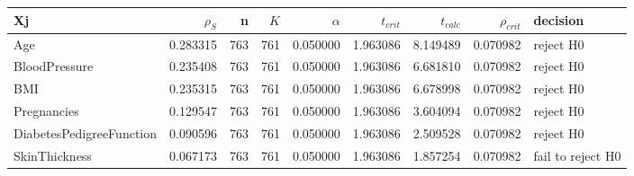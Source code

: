 \begin{tabular}{lrrrrrrrl}
\toprule
Xj & $\rho_S$ & n & $K$ & $\alpha$ & $t_{crit}$ & $t_{calc}$ & $\rho_{crit}$ & decision \\
\midrule
Age & 0.283315 & 763 & 761 & 0.050000 & 1.963086 & 8.149489 & 0.070982 & reject H0 \\
BloodPressure & 0.235408 & 763 & 761 & 0.050000 & 1.963086 & 6.681810 & 0.070982 & reject H0 \\
BMI & 0.235315 & 763 & 761 & 0.050000 & 1.963086 & 6.678998 & 0.070982 & reject H0 \\
Pregnancies & 0.129547 & 763 & 761 & 0.050000 & 1.963086 & 3.604094 & 0.070982 & reject H0 \\
DiabetesPedigreeFunction & 0.090596 & 763 & 761 & 0.050000 & 1.963086 & 2.509528 & 0.070982 & reject H0 \\
SkinThickness & 0.067173 & 763 & 761 & 0.050000 & 1.963086 & 1.857254 & 0.070982 & fail to reject H0 \\
\bottomrule
\end{tabular}
